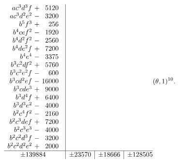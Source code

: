 \[\begin{array}{@{}c|c|c|c@{}}
\begin{array}{r@{\ }c@{\ }r}
ac^3d^3f&+&5120\\
ac^3d^2e^2&-&3200\\
b^5f^3&+&256\\
b^4cef^2&-&1920\\
b^4d^2f^2&-&2560\\
b^4de^2f&+&7200\\
b^4e^4&-&3375\\
b^3c^2df^2&+&5760\\
b^3c^2e^2f&-&600\\
b^3cd^2ef&-&16000\\
b^3cde^3&+&9000\\
b^3d^4f&+&6400\\
b^3d^3e^2&-&4000\\
b^2c^4f^2&-&2160\\
b^2c^3def&+&7200\\
b^2c^3e^3&-&4000\\
b^2c^2d^3f&-&3200\\
b^2c^2d^2e^2&+&2000
\end{array}
\\
\hline
\pm139884 & \pm23570 & \pm18666 & \pm128505
\end{array}(\theta,1)^{10}.
\]
\endgroup
